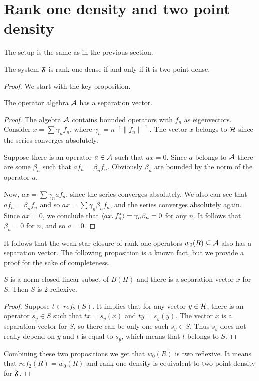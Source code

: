 \documentclass[12pt]{amsart}
\theoremstyle{case}
\begin{document}
\section{Rank one density and two point density}
  The setup is the same as in the previous section.
  \begin{theorem}
    The system $\fsys$ is rank one dense if and only if it is two point dense.
  \end{theorem}
  \begin{proof}
    We start with the key proposition.
    \begin{prop}
      The operator algebra $\cal{A}$ has a separation vector.
    \end{prop}
    \begin{proof}
      The algebra $\cal{A}$ contains bounded operators with $f_n$ as eigenvectors.
      Consider $x = \sum \gamma_n f_n$, where $\gamma_n = n^{-1}\|f_n\|^{-1}$.
      The vector $x$ belongs to $\cal{H}$ since the series converges absolutely.

      Suppose there is an operator $a \in \cal{A}$ such that $ax = 0$.
      Since $a$ belongs to $\cal{A}$ there are some $\beta_n$ such that
      $a f_n = \beta_n f_n$.
      Obviously $\beta_n$ are bounded by the norm of the operator $a$.

      Now, $ax = \sum \gamma_n a f_n$, since the series converges absolutely.
      We also can see that $a f_n = \beta_n f_n$ and so $ax = \sum \gamma_n \beta_n f_n$,
        and the series converges absolutely again.
      Since $ax = 0$, we conclude that $\inner{ax}{f^*_n} = \gamma_n \beta_n = 0$ for any $n$.
      It follows that $\beta_n = 0$ for $n$, and so $a = 0$.
    \end{proof}

    It follows that the weak star closure of rank one operators $w_0(R) \subseteq \cal{A}$ also has a separation vector.
    The following proposition is a known fact, but we provide a proof for the sake of completeness.
    \begin{prop}
      $S$ is a norm closed linear subset of $B(H)$ and there is a separation vector $x$ for $S$.
      Then $S$ is 2-reflexive.
    \end{prop}
    \begin{proof}
      Suppose $t \in ref_2(S)$.
      It implies that for any vector $y \in \cal{H}$, there is an operator $s_y \in S$ such that
        $tx = s_y(x)$ and $ty = s_y(y)$.
      The vector $x$ is a separation vector for $S$, so there can be only one such $s_y \in S$.
      Thus $s_y$ does not really depend on $y$ and $t$ is equal to $s_y$, which means that $t$ belongs
        to $S$.
    \end{proof}
    Combining these two propositions we get that $w_0(R)$ is two reflexive.
    It means that $ref_2(R) = w_0(R)$ and rank one density is equivalent to two point density for $\fsys$.
  \end{proof}
\end{document}
